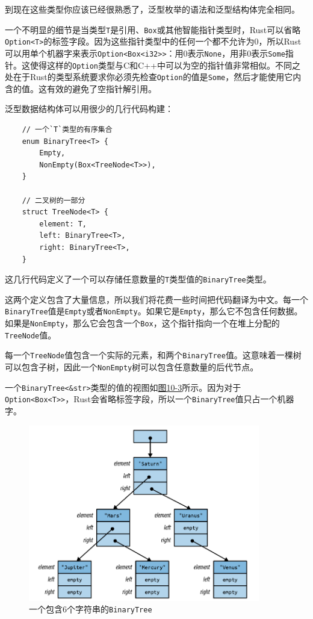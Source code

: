 到现在这些类型你应该已经很熟悉了，泛型枚举的语法和泛型结构体完全相同。

一个不明显的细节是当类型\texttt{T}是引用、\texttt{Box}或其他智能指针类型时，Rust可以省略\\
\texttt{Option<T>}的标签字段。因为这些指针类型中的任何一个都不允许为0，所以Rust可以用单个机器字来表示\texttt{Option<Box<i32>>}：用0表示\texttt{None}，用非0表示\texttt{Some}指针。这使得这样的\texttt{Option}类型与C和C++中可以为空的指针值非常相似。不同之处在于Rust的类型系统要求你必须先检查\texttt{Option}的值是\texttt{Some}，然后才能使用它内含的值。这有效的避免了空指针解引用。

泛型数据结构体可以用很少的几行代码构建：
\begin{verbatim}
    // 一个`T`类型的有序集合
    enum BinaryTree<T> {
        Empty,
        NonEmpty(Box<TreeNode<T>>),
    }

    // 二叉树的一部分
    struct TreeNode<T> {
        element: T,
        left: BinaryTree<T>,
        right: BinaryTree<T>,
    }
\end{verbatim}

这几行代码定义了一个可以存储任意数量的\texttt{T}类型值的\texttt{BinaryTree}类型。

这两个定义包含了大量信息，所以我们将花费一些时间把代码翻译为中文。每一个\texttt{BinaryTree}值是\texttt{Empty}或者\texttt{NonEmpty}。如果它是\texttt{Empty}，那么它不包含任何数据。如果是\texttt{NonEmpty}，那么它会包含一个\texttt{Box}，这个指针指向一个在堆上分配的\texttt{TreeNode}值。

每一个\texttt{TreeNode}值包含一个实际的元素，和两个\texttt{BinaryTree}值。这意味着一棵树可以包含子树，因此一个\texttt{NonEmpty}树可以包含任意数量的后代节点。

一个\texttt{BinaryTree<\&str>}类型的值的视图如\hyperref[f10-3]{图10-3}所示。因为对于\texttt{Option<Box<T>>}，Rust会省略标签字段，所以一个\texttt{BinaryTree}值只占一个机器字。

\begin{figure}[htbp]
    \centering
    \includegraphics[width=0.9\textwidth]{../img/f10-3.png}
    \caption{一个包含6个字符串的\texttt{BinaryTree}}
    \label{f10-3}
\end{figure}

